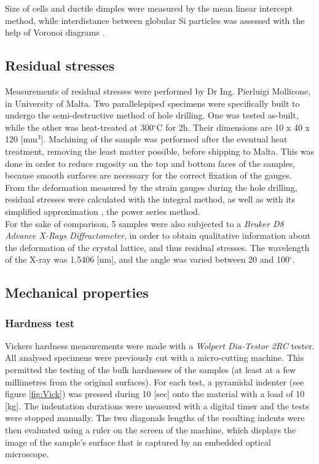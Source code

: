 Size of cells and ductile dimples were measured by the mean linear intercept method, while interdistance between globular Si particles was assessed with the help of Voronoi diagrams \cite{Bertoncelj16}.

\subsection{Residual stresses}

Measurements of residual stresses were performed by Dr Ing. Pierluigi Mollicone, in University of Malta. Two parallelepiped specimens were specifically built to undergo the semi-destructive method of hole drilling. One was tested as-built, while the other was heat-treated at 300$^\circ$C for 2h. Their dimensions are 10 x 40 x 120 [mm$^3$]. Machining of the sample was performed after the eventual heat treatment, removing the least matter possible, before shipping to Malta. This was done in order to reduce rugosity on the top and bottom faces of the samples, because smooth surfaces are necessary for the correct fixation of the gauges. \\

From the deformation measured by the strain gauges during the hole drilling, residual stresses were calculated with the integral method, as well as with its simplified approximation \cite{Trebuna08}, the power series method.\\

For the sake of comparison, 5 samples were also subjected to a \textit{Bruker D8 Advance X-Rays Diffractometer}, in order to obtain qualitative information about the deformation of the crystal lattice, and thus residual stresses. The wavelength of the X-ray was 1.5406 [nm], and the angle was varied between 20 and 100$^\circ$.\\

\subsection{Mechanical properties}

\subsubsection{Hardness test}


Vickers hardness measurements were made with a \textit{Wolpert Dia-Testor 2RC} tester. All analysed specimens were previously cut with a micro-cutting machine. This permitted the testing of the bulk hardnesses of the samples (at least at a few millimetres from the original surfaces). For each test, a pyramidal indenter (see figure \ref{fig:Vick}) was pressed during 10 [sec] onto the material with a load of 10 [kg]. The indentation durations were measured with a digital timer and the tests were stopped manually. The two diagonals lengths of the resulting indents were then evaluated using a ruler on the screen of the machine, which displays the image of the sample's surface that is captured by an embedded optical microscope.\\


